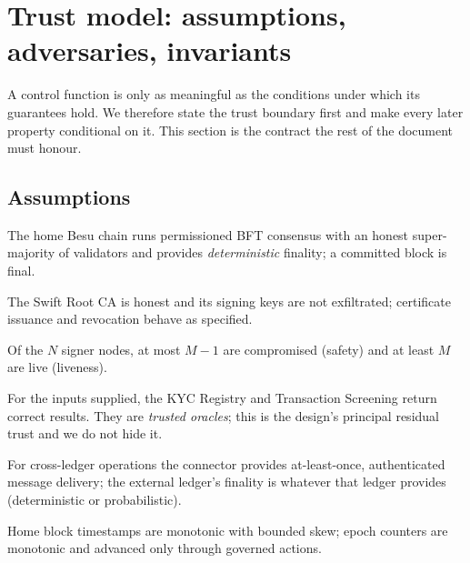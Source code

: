 \documentclass[11pt,a4paper]{article}
\newcommand{\Aref}[1]{\textbf{A#1}}
\begin{document}
\section{Trust model: assumptions, adversaries, invariants}
\label{sec:trust}

A control function is only as meaningful as the conditions under which its
guarantees hold. We therefore state the trust boundary first and make every later
property conditional on it. This section is the contract the rest of the document
must honour.

\subsection{Assumptions}
\begin{description}[leftmargin=2.4em,itemsep=2pt]
  \item[\Aref{1} Ledger finality.] The home Besu chain runs permissioned BFT
  consensus with an honest super-majority of validators and provides
  \emph{deterministic} finality; a committed block is final.
  \item[\Aref{2} CA integrity.] The Swift Root CA is honest and its signing keys
  are not exfiltrated; certificate issuance and revocation behave as specified.
  \item[\Aref{3} Threshold quorum.] Of the $N$ signer nodes, at most $M-1$ are
  compromised (safety) and at least $M$ are live (liveness).
  \item[\Aref{4} PIP correctness.] For the inputs supplied, the KYC Registry and
  Transaction Screening return correct results. They are \emph{trusted oracles};
  this is the design's principal residual trust and we do not hide it.
  \item[\Aref{5} Connector delivery.] For cross-ledger operations the connector
  provides at-least-once, authenticated message delivery; the external ledger's
  finality is whatever that ledger provides (deterministic or probabilistic).
  \item[\Aref{6} Bounded clock.] Home block timestamps are monotonic with bounded
  skew; epoch counters are monotonic and advanced only through governed actions.
\end{description}
\end{document}

